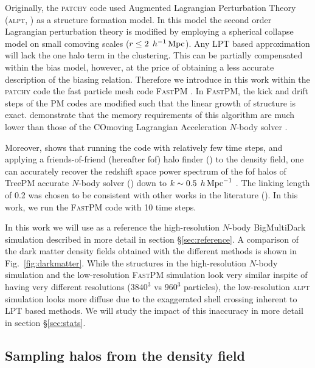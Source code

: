 Originally, the \textsc{patchy} code used Augmented Lagrangian Perturbation Theory (\textsc{alpt}, \citealt{alpt}) as a structure formation model. In this model the second order Lagrangian perturbation theory is modified by employing a spherical collapse model on small comoving scales ($r\leq 2\;\,h^{-1}\,{\rm Mpc}$). 
Any LPT based approximation will lack the one halo term in the clustering. This can be partially compensated within the bias model, however, at the price of obtaining a less accurate description of the biasing relation.
Therefore we introduce in this work within the \textsc{patchy} code the fast particle mesh code \textsc{FastPM} \citep{fastpm}. 
In \textsc{FastPM}, the kick and drift steps of the PM codes are modified such that the linear growth of structure is exact. \citet{fastpm} demonstrate that the memory requirements of this algorithm are much lower than those of the COmoving Lagrangian Acceleration $N$-body solver \citep[\textsc{cola},][]{cola2013}. 

Moreover, \citet{fastpm} shows that running the code with relatively few time steps, and applying a friends-of-friend (hereafter fof) halo finder (\citealt{fof}) to the density field, one can accurately recover the redshift space power spectrum of the fof halos of TreePM accurate $N$-body solver (\citealt{treepm}) down to $k \sim 0.5 \; \,h\,{\rm Mpc}^{-1}$ . The linking length of 0.2 was chosen to be consistent with other works in the literature (\citealt{cola2013}). In this work, we run the \textsc{FastPM} code with 10 time steps. 

In this work we will use as a reference the high-resolution $N$-body BigMultiDark simulation described in more detail in section \S \ref{sec:reference}.
A comparison of the dark matter density fields obtained with the different methods is shown in Fig.~\ref{fig:darkmatter}. While the structures in the high-resolution $N$-body simulation and the low-resolution \textsc{FastPM} simulation look very similar inspite of having very different resolutions ($3840^3$ vs $960^3$ particles), the low-resolution \textsc{alpt} simulation looks more diffuse due to the exaggerated shell crossing inherent to LPT based methods. We will study the impact of this inaccuracy in more detail in section \S \ref{sec:stats}. 

\subsection{Sampling halos from the density field}
\label{sec:bias}

